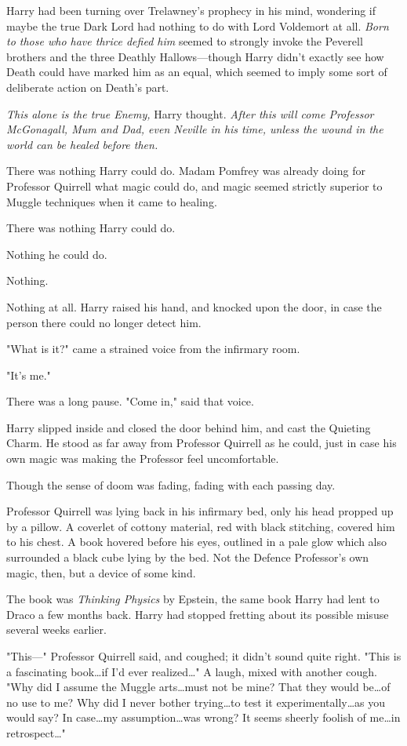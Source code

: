 Harry had been turning over Trelawney's prophecy in his mind, wondering if
maybe the true Dark Lord had nothing to do with Lord Voldemort at all.
\emph{Born to those who have thrice defied him} seemed to strongly invoke the
Peverell brothers and the three Deathly Hallows—though Harry didn't exactly
see how Death could have marked him as an equal, which seemed to imply some
sort of deliberate action on Death's part.

\emph{This alone is the true Enemy,} Harry thought. \emph{After this will come
Professor McGonagall, Mum and Dad, even Neville in his time, unless the wound
in the world can be healed before then.}

There was nothing Harry could do. Madam Pomfrey was already doing for Professor
Quirrell what magic could do, and magic seemed strictly superior to Muggle
techniques when it came to healing.

There was nothing Harry could do.

Nothing he could do.

Nothing.

Nothing at all.
\later
Harry raised his hand, and knocked upon the door, in case the person there
could no longer detect him.

"What is it?" came a strained voice from the infirmary room.

"It's me."

There was a long pause. "Come in," said that voice.

Harry slipped inside and closed the door behind him, and cast the Quieting
Charm. He stood as far away from Professor Quirrell as he could, just in case
his own magic was making the Professor feel uncomfortable.

Though the sense of doom was fading, fading with each passing day.

Professor Quirrell was lying back in his infirmary bed, only his head propped
up by a pillow. A coverlet of cottony material, red with black stitching,
covered him to his chest. A book hovered before his eyes, outlined in a pale
glow which also surrounded a black cube lying by the bed. Not the Defence
Professor's own magic, then, but a device of some kind.

The book was \emph{Thinking Physics} by Epstein, the same book Harry had lent
to Draco a few months back. Harry had stopped fretting about its possible
misuse several weeks earlier.

"This—" Professor Quirrell said, and coughed; it didn't sound quite right.
"This is a fascinating book…if I'd ever realized…" A laugh,
mixed with another cough. "Why did I assume the Muggle arts…must not be
mine? That they would be…of no use to me? Why did I never bother
trying…to test it experimentally…as you would say? In
case…my assumption…was wrong? It seems sheerly foolish of
me…in retrospect…"

